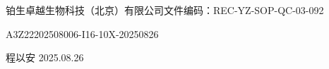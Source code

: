 \documentclass[UTF8,10pt,a4paper,fontset=fandol]{ctexart}
\newcommand{\fieldvalue}[1]{#1}
\newcommand{\handwritten}[1]{#1}
\begin{document}
\newpage

\noindent
铂生卓越生物科技（北京）有限公司\hfill 文件编码：REC-YZ-SOP-QC-03-092

\vspace{0.5em}

\begin{center}
\fieldvalue{A3Z22202508006-I16-10X-20250826}

\vspace{0.5em}

\end{center}

\begin{center}
\handwritten{程以安}\quad
\handwritten{2025.08.26}
\end{center}
\end{document}
